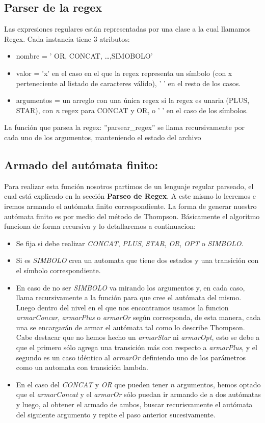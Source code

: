 \subsection{Parser de la regex}
Las expresiones regulares están representadas por una clase a la cual llamamos Regex.
Cada instancia tiene 3 atributos: 
\begin{itemize}
	\item nombre = ' OR, CONCAT, \ldots ,SIMOBOLO'
	\item valor = 'x' en el caso en el que la regex representa un símbolo (con x perteneciente al listado de caracteres válido), ' ' en el resto de los casos.
	\item argumentos = un arreglo con una única regex si la regex es unaria (PLUS, STAR), con \emph{n} regex para CONCAT y OR, o ' ' en el caso de los símbolos.
\end{itemize}
La función que parsea la regex: ''parsear\_regex'' se llama recursivamente por cada uno de los argumentos, manteniendo el estado del archivo


\subsection{Armado del autómata finito:}
Para realizar esta función nosotros partimos de un lenguaje regular parseado, el cual está explicado en la sección \textbf{Parseo de Regex}. A este mismo lo leeremos e iremos armando el autómata finito correspondiente.
La forma de generar nuestro autómata finito es por medio del método de Thompson. Básicamente el algoritmo funciona de forma recursiva y lo detallaremos a continuacion:
\begin{itemize}
\item Se fija si debe realizar \textit{CONCAT}, \textit{PLUS}, \textit{STAR}, \textit{OR}, \textit{OPT} o \textit{SIMBOLO}.
\item Si es \textit{SIMBOLO} crea un automata que tiene dos estados y una transición con el símbolo correspondiente.
\item En caso de no ser \textit{SIMBOLO} va mirando los argumentos y, en cada caso, llama recursivamente a la función para que cree el autómata del mismo. Luego dentro del nivel en el que nos encontramos usamos la funcion \textit{armarConcar}, \textit{armarPlus} o \textit{armarOr} según corresponda, de esta manera, cada una se encargarán de armar el autómata tal como lo describe Thompson. Cabe destacar que no hemos hecho un \textit{armarStar} ni \textit{armarOpt}, esto se debe a que el primero sólo agrega una transición más con respecto a \textit{armarPlus}, y el segundo es un caso idéntico al \textit{armarOr} definiendo uno de los parámetros como un automata con transición lambda.
\item En el caso del \textit{CONCAT} y \textit{OR} que pueden tener $n$ argumentos, hemos optado que el \textit{armarConcat} y el \textit{armarOr} sólo puedan ir armando de a dos autómatas y luego, al obtener el armado de ambos, buscar recurisvamente el autómata del siguiente argumento y repite el paso anterior sucesivamente.
\end{itemize}

